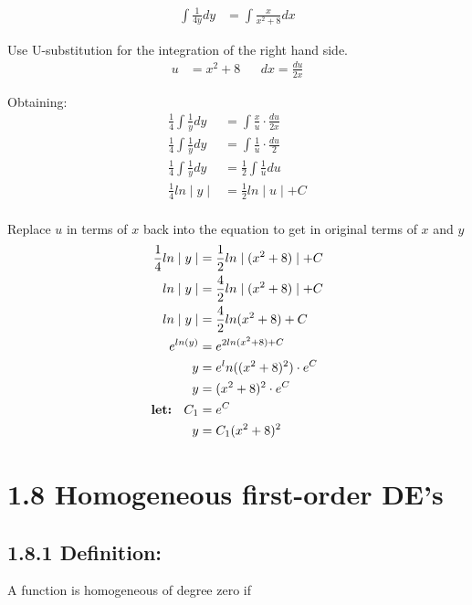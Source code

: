 \documentclass{article}
\begin{document}
\begin{flushleft}
{\begin{align*}
\int \frac{1}{4y} dy & = \int \frac{x}{x^2 + 8} dx
\end{align*}

Use U-substitution for the integration of the right hand side.
\begin{align*}
u & = x^2 + 8  && dx = \frac{du}{2x}
\end{align*}

Obtaining: \\
\begin{align*}
\frac{1}{4}\int\frac{1}{y}dy & = \int \frac{x}{u} \cdot \frac{du}{2x} \\
\frac{1}{4}\int\frac{1}{y}dy & = \int \frac{1}{u} \cdot \frac{du}{2} \\
\frac{1}{4}\int\frac{1}{y}dy & = \frac{1}{2} \int \frac{1}{u} du \\
\frac{1}{4}ln\mid y \mid & = \frac{1}{2} ln \mid u \mid + C \\
\end{align*}

Replace $u$ in terms of $x$ back into the equation to get in original terms of $x$ and $y$\\
\begin{align*}
\frac{1}{4}ln\mid y \mid & = \frac{1}{2} ln \mid (x^2 + 8) \mid + C \\
ln\mid y \mid & = \frac{4}{2} ln \mid (x^2 + 8) \mid + C \\
ln\mid y \mid & = \frac{4}{2} ln (x^2 + 8) + C \\
e^{ln(y)} & = e^{2ln(x^2+8) + C} \\
y & = e^ln((x^2 + 8)^2)\cdot e^C \\
y & = (x^2 + 8)^2 \cdot e^C \\
\text {\textbf{let: } } C_1 & = e^C \\
y & = C_1(x^2 + 8)^2 \\
\end{align*}
}
\section*{1.8 Homogeneous first-order DE’s}{

\subsection*{\textbf{1.8.1 Definition:}}
A function is homogeneous of degree zero if\\

}
\end{flushleft}
\end{document}
